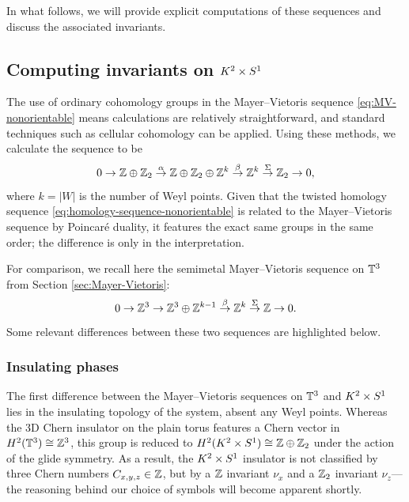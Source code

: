In what follows, we will provide explicit computations of these sequences and discuss the associated invariants.


\subsection{Computing invariants on \texorpdfstring{$K^2\times S^1$}{K²×S¹}}

The use of ordinary cohomology groups in the Mayer--Vietoris sequence \eqref{eq:MV-nonorientable} means calculations are relatively straightforward, and standard techniques such as cellular cohomology can be applied.  Using these methods, we calculate the sequence to be
\begin{equation}\label{eq:explicit-sequence-nonorientable}
	0\to \mathbb{Z}\oplus\mathbb{Z}_2 \overset{\alpha}{\to} \mathbb{Z}\oplus\mathbb{Z}_2\oplus\mathbb{Z}^k \overset{\beta}{\to} \mathbb{Z}^k \overset{\Sigma}{\to} \mathbb{Z}_2 \to 0,
\end{equation}
where $k = |W|$ is the number of Weyl points. Given that the twisted homology sequence \eqref{eq:homology-sequence-nonorientable} is related to the Mayer--Vietoris sequence by Poincaré duality, it features the exact same groups in the same order; the difference is only in the interpretation. 

For comparison, we recall here the semimetal Mayer--Vietoris sequence on $\mathbb{T}^3$ from Section \ref{sec:Mayer-Vietoris}:
\begin{equation}\label{eq:semimetal-MV-explicit-again}
	0 \to \mathbb{Z}^3 \to \mathbb{Z}^3\oplus\mathbb{Z}^{k-1} \overset{\beta}{\to} \mathbb{Z}^k \overset{\Sigma}{\to} \mathbb{Z} \to 0.
\end{equation}
Some relevant differences between these two sequences are highlighted below.

\subsubsection{Insulating phases}

The first difference between the Mayer--Vietoris sequences on $\mathbb{T}^3$ and $K^2\times S^1$ lies in the insulating topology of the system, absent any Weyl points. Whereas the 3D Chern insulator on the plain torus features a Chern vector in $H^2(\mathbb{T}^3)\cong\mathbb{Z}^3$, this group is reduced to $H^2(K^2\times S^1)\cong\mathbb{Z}\oplus\mathbb{Z}_2$ under the action of the glide symmetry. As a result, the $K^2\times S^1$ insulator is not classified by three Chern numbers $C_{x,y,z}\in\mathbb{Z}$, but by a $\mathbb{Z}$ invariant $\nu_x$ and a $\mathbb{Z}_2$ invariant $\nu_z$---the reasoning behind our choice of symbols will become apparent shortly.

